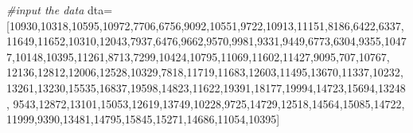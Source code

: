 \documentclass[]{article}
\newenvironment{Shaded}{}{}
\newcommand{\DecValTok}[1]{\textcolor[rgb]{0.25,0.63,0.44}{#1}}
\newcommand{\CommentTok}[1]{\textcolor[rgb]{0.38,0.63,0.69}{\textit{#1}}}
\newcommand{\OperatorTok}[1]{\textcolor[rgb]{0.40,0.40,0.40}{#1}}
\newcommand{\NormalTok}[1]{#1}
\begin{document}
\begin{Shaded}
\begin{Highlighting}[]
\CommentTok{#input the data}
\NormalTok{dta}\OperatorTok{=}\NormalTok{[}\DecValTok{10930}\NormalTok{,}\DecValTok{10318}\NormalTok{,}\DecValTok{10595}\NormalTok{,}\DecValTok{10972}\NormalTok{,}\DecValTok{7706}\NormalTok{,}\DecValTok{6756}\NormalTok{,}\DecValTok{9092}\NormalTok{,}\DecValTok{10551}\NormalTok{,}\DecValTok{9722}\NormalTok{,}\DecValTok{10913}\NormalTok{,}\DecValTok{11151}\NormalTok{,}\DecValTok{8186}\NormalTok{,}\DecValTok{6422}\NormalTok{,}\DecValTok{6337}\NormalTok{,}\DecValTok{11649}\NormalTok{,}\DecValTok{11652}\NormalTok{,}\DecValTok{10310}\NormalTok{,}\DecValTok{12043}\NormalTok{,}\DecValTok{7937}\NormalTok{,}\DecValTok{6476}\NormalTok{,}\DecValTok{9662}\NormalTok{,}\DecValTok{9570}\NormalTok{,}\DecValTok{9981}\NormalTok{,}\DecValTok{9331}\NormalTok{,}\DecValTok{9449}\NormalTok{,}\DecValTok{6773}\NormalTok{,}\DecValTok{6304}\NormalTok{,}\DecValTok{9355}\NormalTok{,}\DecValTok{10477}\NormalTok{,}\DecValTok{10148}\NormalTok{,}\DecValTok{10395}\NormalTok{,}\DecValTok{11261}\NormalTok{,}\DecValTok{8713}\NormalTok{,}\DecValTok{7299}\NormalTok{,}\DecValTok{10424}\NormalTok{,}\DecValTok{10795}\NormalTok{,}\DecValTok{11069}\NormalTok{,}\DecValTok{11602}\NormalTok{,}\DecValTok{11427}\NormalTok{,}\DecValTok{9095}\NormalTok{,}\DecValTok{707}\NormalTok{,}\DecValTok{10767}\NormalTok{, }\DecValTok{12136}\NormalTok{,}\DecValTok{12812}\NormalTok{,}\DecValTok{12006}\NormalTok{,}\DecValTok{12528}\NormalTok{,}\DecValTok{10329}\NormalTok{,}\DecValTok{7818}\NormalTok{,}\DecValTok{11719}\NormalTok{,}\DecValTok{11683}\NormalTok{,}\DecValTok{12603}\NormalTok{,}\DecValTok{11495}\NormalTok{,}\DecValTok{13670}\NormalTok{,}\DecValTok{11337}\NormalTok{,}\DecValTok{10232}\NormalTok{,}\DecValTok{13261}\NormalTok{,}\DecValTok{13230}\NormalTok{,}\DecValTok{15535}\NormalTok{,}\DecValTok{16837}\NormalTok{,}\DecValTok{19598}\NormalTok{,}\DecValTok{14823}\NormalTok{,}\DecValTok{11622}\NormalTok{,}\DecValTok{19391}\NormalTok{,}\DecValTok{18177}\NormalTok{,}\DecValTok{19994}\NormalTok{,}\DecValTok{14723}\NormalTok{,}\DecValTok{15694}\NormalTok{,}\DecValTok{13248}\NormalTok{, }\DecValTok{9543}\NormalTok{,}\DecValTok{12872}\NormalTok{,}\DecValTok{13101}\NormalTok{,}\DecValTok{15053}\NormalTok{,}\DecValTok{12619}\NormalTok{,}\DecValTok{13749}\NormalTok{,}\DecValTok{10228}\NormalTok{,}\DecValTok{9725}\NormalTok{,}\DecValTok{14729}\NormalTok{,}\DecValTok{12518}\NormalTok{,}\DecValTok{14564}\NormalTok{,}\DecValTok{15085}\NormalTok{,}\DecValTok{14722}\NormalTok{, }\DecValTok{11999}\NormalTok{,}\DecValTok{9390}\NormalTok{,}\DecValTok{13481}\NormalTok{,}\DecValTok{14795}\NormalTok{,}\DecValTok{15845}\NormalTok{,}\DecValTok{15271}\NormalTok{,}\DecValTok{14686}\NormalTok{,}\DecValTok{11054}\NormalTok{,}\DecValTok{10395}\NormalTok{]}
\end{Highlighting}
\end{Shaded}
\end{document}
